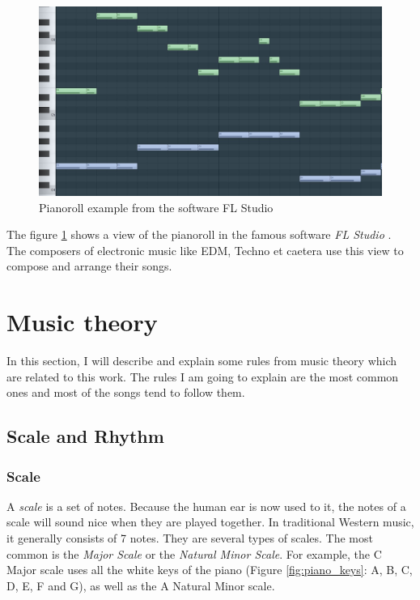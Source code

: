 \documentclass[12pt]{report}
\begin{document}
\begin{figure}[H]
    \centering
    \includegraphics[width=0.75 \textwidth]{images/music/pianoroll/pianoroll_flstudio.jpg}
    \caption{Pianoroll example from the software FL Studio \cite{noauthor_fl_nodate}}
    \label{fig:pianoroll_flstudio}
\end{figure}

The figure \ref{fig:pianoroll_flstudio} shows a view of the pianoroll in the famous software \textit{FL Studio} \cite{noauthor_fl_nodate}. The composers of electronic music like EDM, Techno et caetera use this view to compose and arrange their songs.


\section{Music theory}

In this section, I will describe and explain some rules from music theory which are related to this work. The rules I am going to explain are the most common ones and most of the songs tend to follow them.

\subsection{Scale and Rhythm}

\subsubsection{Scale}

A \textit{scale} is a set of notes. Because the human ear is now used to it, the notes of a scale will sound nice when they are played together. In traditional Western music, it generally consists of 7 notes. They are several types of scales.
The most common is the \textit{Major Scale} or the \textit{Natural Minor Scale}. For example, the C Major scale uses all the white keys of the piano (Figure \ref{fig:piano_keys}: A, B, C, D, E, F and G), as well as the A Natural Minor scale.
\end{document}
